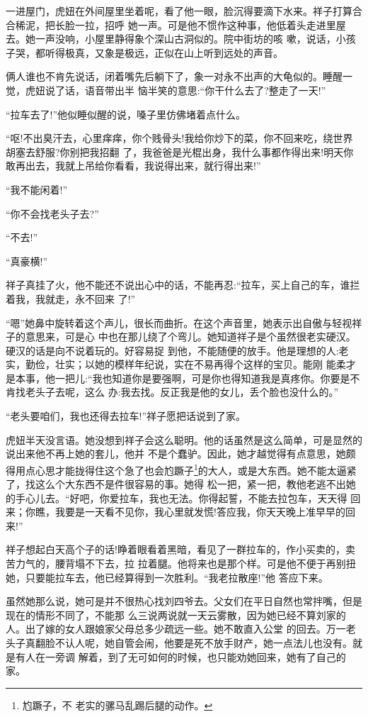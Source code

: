 \documentclass[11pt,a4paper,onecolumn]{article}
\begin{document}
一进屋门，虎妞在外间屋里坐着呢，看了他一眼，脸沉得要滴下水来。祥子打算合合稀泥，把长脸一拉，招呼
她一声。可是他不惯作这种事，他低着头走进里屋去。她一声没响，小屋里静得象个深山古洞似的。院中街坊的咳
嗽，说话，小孩子哭，都听得极真，又象是极远，正似在山上听到远处的声音。

俩人谁也不肯先说话，闭着嘴先后躺下了，象一对永不出声的大龟似的。睡醒一觉，虎妞说了话，语音带出半
恼半笑的意思:``你干什么去了?整走了一天!''

``拉车去了!''他似睡似醒的说，嗓子里仿佛堵着点什么。

``呕!不出臭汗去，心里痒痒，你个贱骨头!我给你炒下的菜，你不回来吃，绕世界胡塞去舒服?你别把我招翻
了，我爸爸是光棍出身，我什么事都作得出来!明天你敢再出去，我就上吊给你看看，我说得出来，就行得出来!''

``我不能闲着!''

``你不会找老头子去?''

``不去!''

``真豪横!''

祥子真挂了火，他不能还不说出心中的话，不能再忍:``拉车，买上自己的车，谁拦着我，我就走，永不回来
了!''

``嗯\myrule ''她鼻中旋转着这个声儿，很长而曲折。在这个声音里，她表示出自傲与轻视祥子的意思来，可是心
中也在那儿绕了个弯儿。她知道祥子是个\myrule 虽然很老实\myrule 硬汉。硬汉的话是向不说着玩的。好容易捉
到他，不能随便的放手。他是理想的人:老实，勤俭，壮实；以她的模样年纪说，实在不易再得个这样的宝贝。能刚
能柔才是本事，他一把儿:``我也知道你是要强啊，可是你也得知道我是真疼你。你要是不肯找老头子去呢，这么
办:我去找。反正我是他的女儿，丢个脸也没什么的。''

``老头要咱们，我也还得去拉车!''祥子愿把话说到了家。

虎妞半天没言语。她没想到祥子会这么聪明。他的话虽然是这么简单，可是显然的说出来他不再上她的套儿，他并
不是个蠢驴。因此，她才越觉得有点意思，她颇得用点心思才能拢得住这个急了也会尥蹶子\footnote{尥蹶子，不
  老实的骡马乱踢后腿的动作。}的大人，或是大东西。她不能太逼紧了，找这么个大东西不是件很容易的事。她得
松一把，紧一把，教他老逃不出她的手心儿去。``好吧，你爱拉车，我也无法。你得起誓，不能去拉包车，天天得
回来；你瞧，我要是一天看不见你，我心里就发慌!答应我，你天天晚上准早早的回来!''

祥子想起白天高个子的话!睁着眼看着黑暗，看见了一群拉车的，作小买卖的，卖苦力气的，腰背塌不下去，拉
拉着腿。他将来也是那个样。可是他不便于再别扭她，只要能拉车去，他已经算得到一次胜利。``我老拉散座!''他
答应下来。

虽然她那么说，她可是并不很热心找刘四爷去。父女们在平日自然也常拌嘴，但是现在的情形不同了，不能那
么三说两说就一天云雾散，因为她已经不算刘家的人。出了嫁的女人跟娘家父母总多少疏远一些。她不敢直入公堂
的回去。万一老头子真翻脸不认人呢，她自管会闹，他要是死不放手财产，她一点法儿也没有。就是有人在一旁调
解着，到了无可如何的时候，也只能劝她回来，她有了自己的家。
\end{document}

